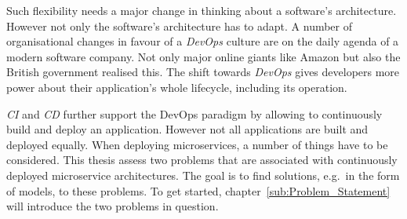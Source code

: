Such flexibility needs a major change in thinking about a software's
architecture. However not only the software's architecture has to adapt. A
number of organisational changes in favour of a \textit{DevOps} culture are on
the daily agenda of a modern software company. Not only major online giants
like Amazon \autocite{JenkinsVelocityCulture2011} but also the British
government \autocite{LoweLeadingwaymicroservices2016} realised this. The shift
towards \textit{DevOps} gives developers more power about
their application's whole lifecycle, including its operation. 

\textit{\acf{CI}} and \textit{\acf{CD}} further support the DevOps paradigm by
allowing to continuously build and deploy an application. However not all
applications are built and deployed equally. When deploying microservices, a
number of things have to be considered. This thesis assess two problems that
are associated with continuously deployed microservice architectures. The goal
is to find solutions, e.g.\ in the form of models, to these problems. To get
started, chapter~\ref{sub:Problem_Statement} will introduce the two problems
in question.
